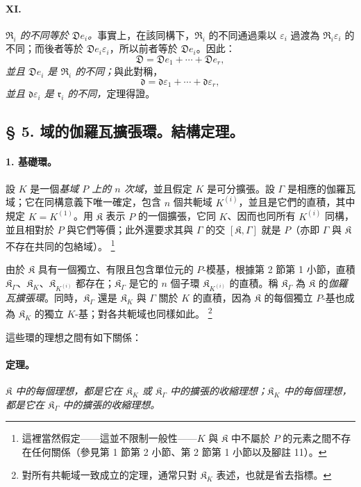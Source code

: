 \documentclass[11pt]{article}
\providecommand{\srcfn}[2]{%
  \begingroup
  \renewcommand{\thefootnote}{#1}%
  \footnote{#2}%
  \addtocounter{footnote}{-1}%
  \endgroup}
\begin{document}
\paragraph{XI.}
\emph{$\mathfrak R_i$ 的不同等於 $\mathfrak D e_i$。}事實上，在該同構下，$\mathfrak R_i$ 的不同通過乘以 $\varepsilon_i$ 過渡為 $\mathfrak R_i\varepsilon_i$ 的不同；而後者等於 $\mathfrak D e_i\varepsilon_i$，所以前者等於 $\mathfrak D e_i$。因此：
\[
\mathfrak D=\mathfrak D e_1+\cdots+\mathfrak D e_r,
\]
\emph{並且 $\mathfrak D e_i$ 是 $\mathfrak R_i$ 的不同；}與此對稱，
\[
\mathfrak d=\mathfrak d\varepsilon_1+\cdots+\mathfrak d\varepsilon_r,
\]
\emph{並且 $\mathfrak d\varepsilon_i$ 是 $\mathfrak r_i$ 的不同，}定理得證。
\subsection*{\S{} 5. 域的伽羅瓦擴張環。結構定理。}

\paragraph{1. 基礎環。}
設 $K$ 是一個\emph{基域 $P$ 上的 $n$ 次域}，並且假定 $K$ 是可分擴張。設 $\Gamma$ 是相應的伽羅瓦域；它在同構意義下唯一確定，包含 $n$ 個共軛域 $K^{(i)}$，並且是它們的直積，其中規定 $K=K^{(1)}$。用 $\mathfrak K$ 表示 $P$ 的一個擴張，它同 $K$、因而也同所有 $K^{(i)}$ 同構，並且相對於 $P$ 與它們等價；此外還要求其與 $\Gamma$ 的交 $[\mathfrak K,\Gamma]$ 就是 $P$（亦即 $\Gamma$ 與 $\mathfrak K$ 不存在共同的包絡域）。\srcfn{15)}{這裡當然假定——這並不限制一般性——$K$ 與 $\mathfrak K$ 中不屬於 $P$ 的元素之間不存在任何關係（參見第 1 節第 2 小節、第 2 節第 1 小節以及腳註 11）。}由於 $\mathfrak K$ 具有一個獨立、有限且包含單位元的 $P$-模基，根據第 2 節第 1 小節，直積 $\mathfrak K_\Gamma$、$\mathfrak K_K$、$\mathfrak K_{K^{(i)}}$ 都存在；$\mathfrak K_\Gamma$ 是它的 $n$ 個子環 $\mathfrak K_{K^{(i)}}$ 的直積。稱 $\mathfrak K_\Gamma$ 為 $\mathfrak K$ 的\emph{伽羅瓦擴張環}。同時，$\mathfrak K_\Gamma$ 還是 $\mathfrak K_K$ 與 $\Gamma$ 關於 $K$ 的直積，因為 $\mathfrak K$ 的每個獨立 $P$-基也成為 $\mathfrak K_K$ 的獨立 $K$-基；對各共軛域也同樣如此。\srcfn{16)}{對所有共軛域一致成立的定理，通常只對 $\mathfrak K_K$ 表述，也就是省去指標。}這些環的理想之間有如下關係：

\paragraph{定理。}
\emph{$\mathfrak K$ 中的每個理想，都是它在 $\mathfrak K_K$ 或 $\mathfrak K_\Gamma$ 中的擴張的收縮理想；$\mathfrak K_K$ 中的每個理想，都是它在 $\mathfrak K_\Gamma$ 中的擴張的收縮理想。}
\end{document}
